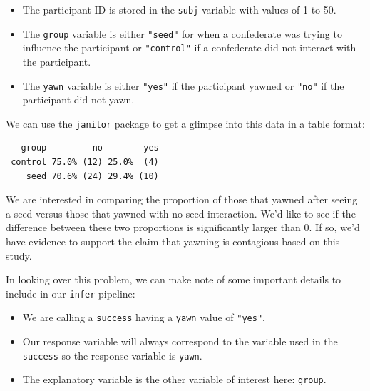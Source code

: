 \documentclass[12pt,]{krantz}
\makeatletter
\newenvironment{Shaded}{\begin{snugshade}}{\end{snugshade}}
\newcommand{\KeywordTok}[1]{\textcolor[rgb]{0.27,0.27,0.27}{\textbf{#1}}}
\newcommand{\StringTok}[1]{\textcolor[rgb]{0.5,0.5,0.5}{#1}}
\newcommand{\CommentTok}[1]{\textcolor[rgb]{0.37,0.37,0.37}{\textit{#1}}}
\newcommand{\OperatorTok}[1]{\textcolor[rgb]{0.43,0.43,0.43}{\textbf{#1}}}
\newcommand{\NormalTok}[1]{#1}
\providecommand{\tightlist}{%
  \setlength{\itemsep}{0pt}\setlength{\parskip}{0pt}}
\newenvironment{kframe}{%
\medskip{}
\setlength{\fboxsep}{.8em}
 \def\at@end@of@kframe{}%
 \ifinner\ifhmode%
  \def\at@end@of@kframe{\end{minipage}}%
  \begin{minipage}{\columnwidth}%
 \fi\fi%
 \def\FrameCommand##1{\hskip\@totalleftmargin \hskip-\fboxsep
 \colorbox{shadecolor}{##1}\hskip-\fboxsep
     \hskip-\linewidth \hskip-\@totalleftmargin \hskip\columnwidth}%
 \MakeFramed {\advance\hsize-\width
   \@totalleftmargin\z@ \linewidth\hsize
   \@setminipage}}%
 {\par\unskip\endMakeFramed%
 \at@end@of@kframe}
\renewenvironment{Shaded}{\begin{kframe}}{\end{kframe}}
\theoremstyle{definition}
\theoremstyle{definition}
\theoremstyle{definition}
\theoremstyle{remark}
\makeatother
\begin{document}
\begin{itemize}
\tightlist
\item
  The participant ID is stored in the \texttt{subj} variable with values
  of 1 to 50.
\item
  The \texttt{group} variable is either \texttt{"seed"} for when a
  confederate was trying to influence the participant or
  \texttt{"control"} if a confederate did not interact with the
  participant.
\item
  The \texttt{yawn} variable is either \texttt{"yes"} if the participant
  yawned or \texttt{"no"} if the participant did not yawn.
\end{itemize}

We can use the \texttt{janitor} package to get a glimpse into this data
in a table format:

\begin{Shaded}
\end{Shaded}

\begin{verbatim}
   group         no        yes
 control 75.0% (12) 25.0%  (4)
    seed 70.6% (24) 29.4% (10)
\end{verbatim}

We are interested in comparing the proportion of those that yawned after
seeing a seed versus those that yawned with no seed interaction. We'd
like to see if the difference between these two proportions is
significantly larger than 0. If so, we'd have evidence to support the
claim that yawning is contagious based on this study.

In looking over this problem, we can make note of some important details
to include in our \texttt{infer} pipeline:

\begin{itemize}
\tightlist
\item
  We are calling a \texttt{success} having a \texttt{yawn} value of
  \texttt{"yes"}.
\item
  Our response variable will always correspond to the variable used in
  the \texttt{success} so the response variable is \texttt{yawn}.
\item
  The explanatory variable is the other variable of interest here:
  \texttt{group}.
\end{itemize}
\end{document}
